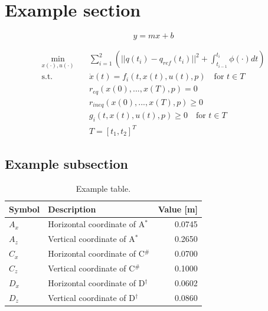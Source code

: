 \section*{Example section}
\lipsum[1]

\begin{equation}
    y = mx + b
    \label{eqn:linear}
\end{equation}

\begin{subequations}
    \begin{align}
        \min_{x(\cdot),u(\cdot)} \quad & \sum_{i=1}^{2} \left( ||q(t_i) - q_{ref}(t_i)||^2 + \int_{{t}_{i-1}}^{{t}_{i}} {\phi(\cdot)dt} \right) \label{ma_ocp_objfunc} \\
        \textrm{s.t.} \quad & \dot{x}(t) = f_{i}(t, x(t), u(t), p) \quad \textrm{for } t \in T \label{ma_ocp_eom}\\
         & r_{eq}(x(0), ..., x(T), p) = 0 \label{ma_ocp_req}\\
         & r_{ineq}(x(0), ..., x(T), p) \geq 0 \label{ma_ocp_rineq}\\
         & g_{i}(t, x(t), u(t), p) \geq 0 \quad \textrm{for } t \in T \label{ma_ocp_g}\\
         & T = [t_1, t_2]^T \label{T}
    \end{align}
    \label{eqn:ma_ocp}
\end{subequations}

\subsection{Example subsection}
\lipsum[2]

\begin{table}[h]
\caption{Example table.}
   \begin{tabularx}{0.48\textwidth}{llr}
   		 \toprule 
   		 Symbol & \multicolumn{1}{X}{Description} & Value [m] \\
		 \midrule
		  $A_x$ & Horizontal coordinate of A$^{*}$ & 0.0745 \\
		  $A_z$ & Vertical coordinate of A$^{*}$ & 0.2650 \\  \noalign{\smallskip}
		  
		  $C_x$ & Horizontal coordinate of C$^{\#}$ & 0.0700 \\
		  $C_z$ & Vertical coordinate of C$^{\#}$ & 0.1000 \\
		  $D_x$ & Horizontal coordinate of D$^{\dag}$ & 0.0602 \\
		  $D_z$ & Vertical coordinate of D$^{\dag}$ & 0.0860 \\
		 \bottomrule
   \end{tabularx}  \label{tab:initmodel}
\end{table}


